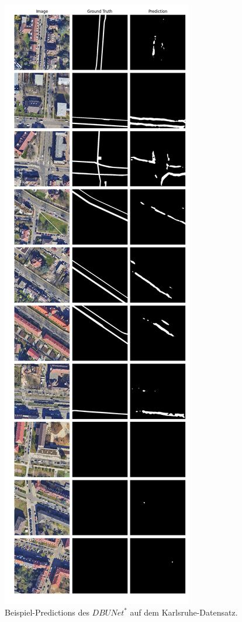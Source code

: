 \begin{figure}
	\centering
	\includegraphics[width=.41\textwidth]{Bilder/Samples-KA/dbunet-s.png} 
	\caption{Beispiel-Predictions des $DBUNet^*$ auf dem Karlsruhe-Datensatz.}
	\label{fig:ka-samples-dbunet-s}
\end{figure}



